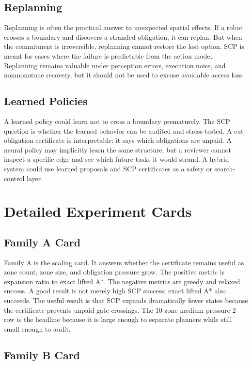 \documentclass{article}
\begin{document}
\subsection{Replanning}

Replanning is often the practical answer to unexpected spatial effects. If a robot crosses a boundary and discovers a stranded obligation, it can replan. But when the commitment is irreversible, replanning cannot restore the lost option. SCP is meant for cases where the failure is predictable from the action model. Replanning remains valuable under perception errors, execution noise, and nonmonotone recovery, but it should not be used to excuse avoidable access loss.

\subsection{Learned Policies}

A learned policy could learn not to cross a boundary prematurely. The SCP question is whether the learned behavior can be audited and stress-tested. A cut-obligation certificate is interpretable: it says which obligations are unpaid. A neural policy may implicitly learn the same structure, but a reviewer cannot inspect a specific edge and see which future tasks it would strand. A hybrid system could use learned proposals and SCP certificates as a safety or search-control layer.

\section{Detailed Experiment Cards}

\subsection{Family A Card}

Family A is the scaling card. It answers whether the certificate remains useful as zone count, zone size, and obligation pressure grow. The positive metric is expansion ratio to exact lifted A*. The negative metrics are greedy and relaxed success. A good result is not merely high SCP success; exact lifted A* also succeeds. The useful result is that SCP expands dramatically fewer states because the certificate prevents unpaid gate crossings. The 10-zone medium pressure-2 row is the headline because it is large enough to separate planners while still small enough to audit.

\subsection{Family B Card}
\end{document}
